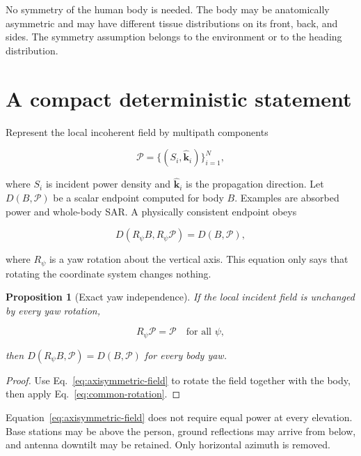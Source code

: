 \documentclass[11pt]{article}
\newtheorem{proposition}{Proposition}
\begin{document}
No symmetry of the human body is needed. The body may be anatomically
asymmetric and may have different tissue distributions on its front, back, and
sides. The symmetry assumption belongs to the environment or to the heading
distribution.

\section{A compact deterministic statement}

Represent the local incoherent field by multipath components

\begin{equation}
  \mathcal{P}=\{(S_i,\widehat{\mathbf{k}}_i)\}_{i=1}^{N},
\end{equation}

where $S_i$ is incident power density and
$\widehat{\mathbf{k}}_i$ is the propagation direction. Let
$D(B,\mathcal{P})$ be a scalar endpoint computed for body $B$. Examples are
absorbed power and whole-body SAR. A physically consistent endpoint obeys

\begin{equation}\label{eq:common-rotation}
  D(R_\psi B,R_\psi\mathcal{P})=D(B,\mathcal{P}),
\end{equation}

where $R_\psi$ is a yaw rotation about the vertical axis. This equation only
says that rotating the coordinate system changes nothing.

\begin{proposition}[Exact yaw independence]
If the local incident field is unchanged by every yaw rotation,

\begin{equation}\label{eq:axisymmetric-field}
  R_\psi\mathcal{P}=\mathcal{P}
  \quad\text{for all }\psi,
\end{equation}

then $D(R_\psi B,\mathcal{P})=D(B,\mathcal{P})$ for every body yaw.
\end{proposition}

\begin{proof}
Use Eq.~\eqref{eq:axisymmetric-field} to rotate the field together with the
body, then apply Eq.~\eqref{eq:common-rotation}.
\end{proof}

Equation~\eqref{eq:axisymmetric-field} does not require equal power at every
elevation. Base stations may be above the person, ground reflections may arrive
from below, and antenna downtilt may be retained. Only horizontal azimuth is
removed.
\end{document}
